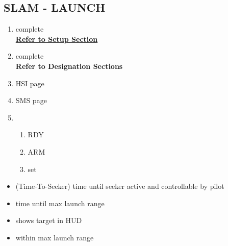 \documentclass[fontHelvetica, widesubsec]{TechCheck}
\begin{document}
	\subsection{SLAM - LAUNCH}
	\label{subsec:84launch}
	\begin{enumerate}
		\item {}\dotfill complete \\
		\hfill \hyperref[subsec:84setup]{\textbf{Refer to Setup Section}}
		\item {}\dotfill complete \\
		\hfill \textbf{Refer to Designation Sections}
		\item {}\dotfill HSI page
		\item {}\dotfill SMS page
		\item {}
		\begin{enumerate}
			\item {}\dotfill RDY
			\item {}\dotfill ARM
			\item {}\dotfill set
		\end{enumerate}
	\end{enumerate}
	\thumbnar
		\begin{itemize}
			\item {} (Time-To-Seeker) time until seeker active and controllable by pilot
			\item {} time until max launch range
			\item {} shows target in HUD
			\item {} within max launch range
		\end{itemize}
\end{document}
